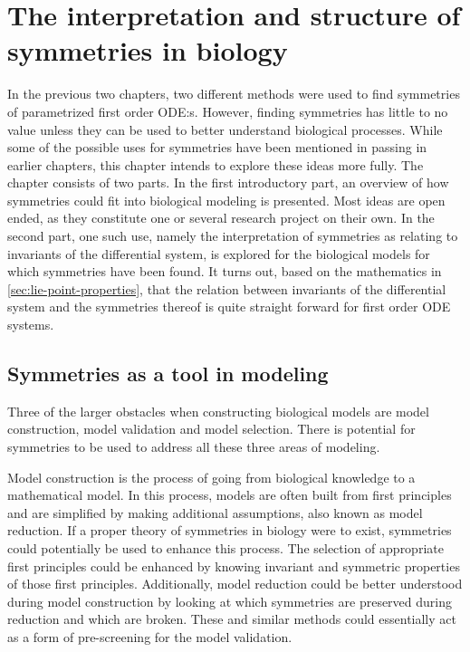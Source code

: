 \chapter{The interpretation and structure of symmetries in biology} \label{ch:uses}

In the previous two chapters, two different methods were used to find symmetries of parametrized first order ODE:s.
However, finding symmetries has little to no value unless they can be used to better understand biological processes.
While some of the possible uses for symmetries have been mentioned in passing in earlier chapters, this chapter intends to explore these ideas more fully.
The chapter consists of two parts.
In the first introductory part, an overview of how symmetries could fit into biological modeling is presented.
Most ideas are open ended, as they constitute one or several research project on their own.
In the second part, one such use, namely the interpretation of symmetries as relating to invariants of the differential system, is explored for the biological models for which symmetries have been found.
It turns out, based on the mathematics in \cref{sec:lie-point-properties}, that the relation between invariants of the differential system and the symmetries thereof is quite straight forward for first order ODE systems.

\section{Symmetries as a tool in modeling} \label{sec:symmetries-as-tool}

Three of the larger obstacles when constructing biological models are model construction, model validation and model selection.
There is potential for symmetries to be used to address all these three areas of modeling.

Model construction is the process of going from biological knowledge to a mathematical model.
In this process, models are often built from first principles and are simplified by making additional assumptions, also known as model reduction.
If a proper theory of symmetries in biology were to exist, symmetries could potentially be used to enhance this process.
The selection of appropriate first principles could be enhanced by knowing invariant and symmetric properties of those first principles.
Additionally, model reduction could be better understood during model construction by looking at which symmetries are preserved during reduction and which are broken.
These and similar methods could essentially act as a form of pre-screening for the model validation.

